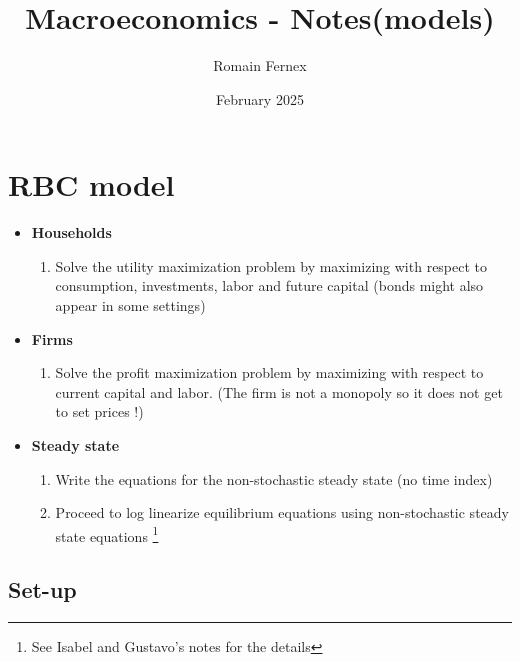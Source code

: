 \documentclass{article}
\title{Macroeconomics - Notes(models)}
\author{Romain Fernex}
\date{February 2025}
\begin{document}
\maketitle
\tableofcontents

\section{RBC model}

\begin{solutionoutlinebox}
\begin{itemize}
    \item \textbf{Households}
    \begin{enumerate}
        \item Solve the utility maximization problem by maximizing with respect to consumption, investments, labor and future capital (bonds might also appear in some settings)
    \end{enumerate}
    \item \textbf{Firms}
    \begin{enumerate}
        \item Solve the profit maximization problem by maximizing with respect to current capital and labor. (The firm is not a monopoly so it does not get to set prices !)
    \end{enumerate}
    \item \textbf{Steady state}
    \begin{enumerate}
        \item Write the equations for the non-stochastic steady state (no time index)
        \item Proceed to log linearize equilibrium equations using non-stochastic steady state equations \footnote{See Isabel and Gustavo's notes for the details}
    \end{enumerate}
\end{itemize}
\end{solutionoutlinebox}

\subsection{Set-up}
\end{document}
